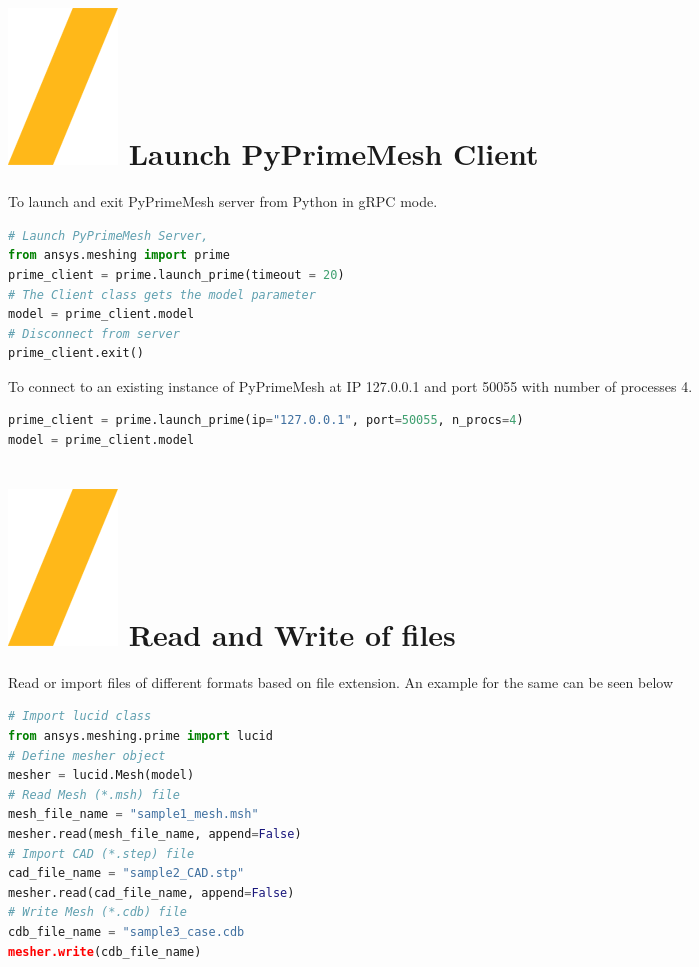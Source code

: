 \documentclass[9pt,landscape]{article}
\begin{document}
\begin{multicols}{3}
\setlength{\premulticols}{1pt}
\setlength{\postmulticols}{1pt}
\setlength{\multicolsep}{1pt}
\setlength{\columnsep}{2pt}

\vfill
\section{\includegraphics[height=\fontcharht\font`\S]{slash.png} Launch PyPrimeMesh Client}
To launch and exit PyPrimeMesh server from Python in gRPC mode.\\
\begin{lstlisting}[language=Python]
# Launch PyPrimeMesh Server, 
from ansys.meshing import prime
prime_client = prime.launch_prime(timeout = 20)
# The Client class gets the model parameter 
model = prime_client.model
# Disconnect from server
prime_client.exit() 
\end{lstlisting}

To connect to an existing instance of PyPrimeMesh at IP
127.0.0.1 and port 50055 with number of processes 4.
\begin{lstlisting}[language=Python]
prime_client = prime.launch_prime(ip="127.0.0.1", port=50055, n_procs=4)
model = prime_client.model
\end{lstlisting}

\section{\includegraphics[height=\fontcharht\font`\S]{slash.png} Read and Write of files }
Read or import files of different formats based on file extension.
An example for the same can be seen below\\
\begin{lstlisting}[language=Python]
# Import lucid class
from ansys.meshing.prime import lucid
# Define mesher object
mesher = lucid.Mesh(model)
# Read Mesh (*.msh) file
mesh_file_name = "sample1_mesh.msh"
mesher.read(mesh_file_name, append=False)
# Import CAD (*.step) file
cad_file_name = "sample2_CAD.stp"
mesher.read(cad_file_name, append=False)
# Write Mesh (*.cdb) file
cdb_file_name = "sample3_case.cdb
mesher.write(cdb_file_name)
\end{lstlisting}


\end{multicols}
\end{document}
